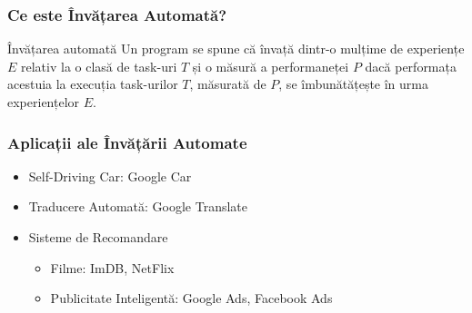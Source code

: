 \begin{frame}
  \frametitle{Ce este Învățarea Automată?}
  \begin{block}{Învățarea automată}
    Un program se spune că învață dintr-o mulțime de experiențe $E$
    relativ la o clasă de task-uri $T$ și o măsură a performaneței $P$
    dacă performața acestuia la execuția task-urilor $T$, măsurată de $P$,
    se îmbunătățește în urma experiențelor $E$.
    \citep{Mitchell:1997:ML:541177}
  \end{block}
\end{frame}

\begin{frame}[t]
  \frametitle{Aplicații ale Învățării Automate}
  \begin{itemize}
  \item \alert<1>{Self-Driving Car: Google Car}
  \item \alert<2>{Traducere Automată: Google Translate}
  \item \alert<3->{Sisteme de Recomandare}
    \begin{itemize}
    \item \alert<3>{Filme: ImDB, NetFlix}
    \item \alert<4>{Publicitate Inteligentă: Google Ads, Facebook Ads}
    \end{itemize}
  \end{itemize}
  \begin{center}%

\end{center}
\end{frame}
